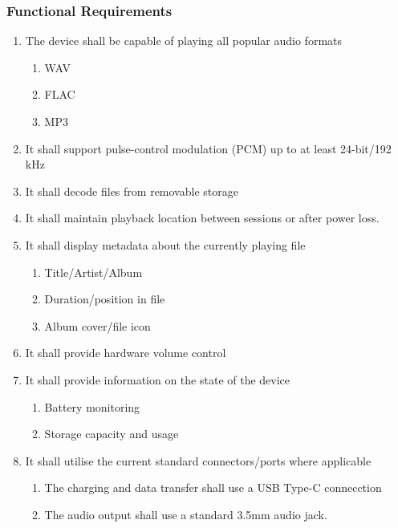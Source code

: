 \documentclass{article}
\begin{document}
\subsubsection{Functional Requirements}
\begin{enumerate}
    \item The device shall be capable of playing all popular audio formats
        \begin{enumerate}
            \item WAV
            \item FLAC
            \item MP3
        \end{enumerate}
    \item It shall support pulse-control modulation (PCM) up to at least 24-bit/192 kHz
    \item It shall decode files from removable storage
    \item It shall maintain playback location between sessions or after power loss.
    \item It shall display metadata about the currently playing file
        \begin{enumerate}
            \item Title/Artist/Album
            \item Duration/position in file
            \item Album cover/file icon
        \end{enumerate}
    \item It shall provide hardware volume control
    \item It shall provide information on the state of the device
        \begin{enumerate}
            \item Battery monitoring
            \item Storage capacity and usage
        \end{enumerate}
    \item It shall utilise the current standard connectors/ports where applicable
        \begin{enumerate}
            \item The charging and data transfer shall use a USB Type-C connecction
            \item The audio output shall use a standard 3.5mm audio jack.
        \end{enumerate}
\end{enumerate}
\end{document}
